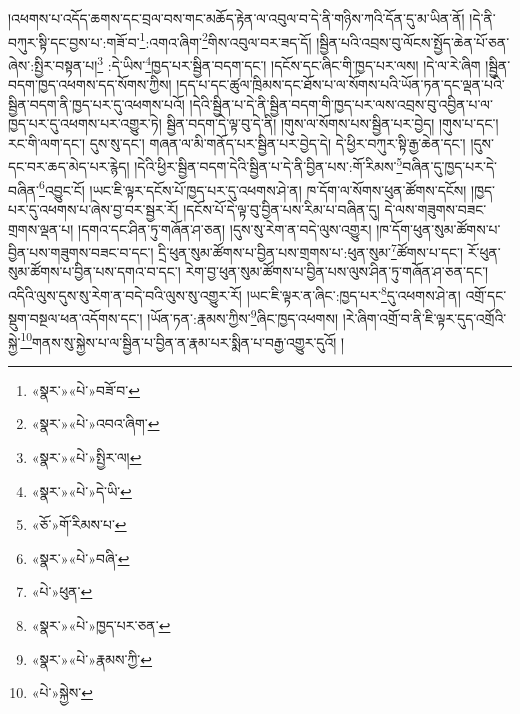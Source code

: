 །འཕགས་པ་འདོད་ཆགས་དང་བྲལ་བས་གང་མཆོད་རྟེན་ལ་འབུལ་བ་དེ་ནི་གཉིས་ཀའི་དོན་དུ་མ་ཡིན་ནོ། །དེ་ནི་བཀུར་སྟི་དང་བྱས་པ་:གཟོ་བ་\footnote{«སྣར་»«པེ་»བཟོ་བ་}:འགའ་ཞིག་\footnote{«སྣར་»«པེ་»འབའ་ཞིག་}གིས་འབུལ་བར་ཟད་དོ། །སྦྱིན་པའི་འབྲས་བུ་ལོངས་སྤྱོད་ཆེན་པོ་ཅན་ཞེས་:སྤྱིར་བསྟན་པ།\footnote{«སྣར་»«པེ་»སྤྱིར་ལ།} :དེ་ཡིས་\footnote{«སྣར་»«པེ་»དེ་ཡི་}ཁྱད་པར་སྦྱིན་བདག་དང་། །དངོས་དང་ཞིང་གི་ཁྱད་པར་ལས། །དེ་ལ་རེ་ཞིག །སྦྱིན་བདག་ཁྱད་འཕགས་དད་སོགས་ཀྱིས། །དད་པ་དང་ཚུལ་ཁྲིམས་དང་ཐོས་པ་ལ་སོགས་པའི་ཡོན་ཏན་དང་ལྡན་པའི་སྦྱིན་བདག་ནི་ཁྱད་པར་དུ་འཕགས་པའོ། །དེའི་སྦྱིན་པ་དེ་ནི་སྦྱིན་བདག་གི་ཁྱད་པར་ལས་འབྲས་བུ་འབྱིན་པ་ལ་ཁྱད་པར་དུ་འཕགས་པར་འགྱུར་ཏེ། སྦྱིན་བདག་དེ་ལྟ་བུ་དེ་ནི། །གུས་ལ་སོགས་པས་སྦྱིན་པར་བྱེད། །གུས་པ་དང་། རང་གི་ལག་དང་། དུས་སུ་དང་། གཞན་ལ་མི་གནོད་པར་སྦྱིན་པར་བྱེད་དེ། དེ་ཕྱིར་བཀུར་སྟི་རྒྱ་ཆེན་དང་། །དུས་དང་བར་ཆད་མེད་པར་རྙེད། །དེའི་ཕྱིར་སྦྱིན་བདག་དེའི་སྦྱིན་པ་དེ་ནི་བྱིན་པས་:གོ་རིམས་\footnote{«ཅོ་»གོ་རིམས་པ་}བཞིན་དུ་ཁྱད་པར་དེ་བཞིན་\footnote{«སྣར་»«པེ་»བཞི་}འབྱུང་ངོ། །ཡང་ཇི་ལྟར་དངོས་པོ་ཁྱད་པར་དུ་འཕགས་ཤེ་ན། ཁ་དོག་ལ་སོགས་ཕུན་ཚོགས་དངོས། །ཁྱད་པར་དུ་འཕགས་པ་ཞེས་བྱ་བར་སྦྱར་རོ། །དངོས་པོ་དེ་ལྟ་བུ་བྱིན་པས་རིམ་པ་བཞིན་དུ། དེ་ལས་གཟུགས་བཟང་གྲགས་ལྡན་པ། །དགའ་དང་ཤིན་ཏུ་གཞོན་ཤ་ཅན། །དུས་སུ་རེག་ན་བདེ་ལུས་འགྱུར། །ཁ་དོག་ཕུན་སུམ་ཚོགས་པ་བྱིན་པས་གཟུགས་བཟང་བ་དང་། དྲི་ཕུན་སུམ་ཚོགས་པ་བྱིན་པས་གྲགས་པ་:ཕུན་སུམ་\footnote{«པེ་»ཕུན་}ཚོགས་པ་དང་། རོ་ཕུན་སུམ་ཚོགས་པ་བྱིན་པས་དགའ་བ་དང་། རེག་བྱ་ཕུན་སུམ་ཚོགས་པ་བྱིན་པས་ལུས་ཤིན་ཏུ་གཞོན་ཤ་ཅན་དང་། འདིའི་ལུས་དུས་སུ་རེག་ན་བདེ་བའི་ལུས་སུ་འགྱུར་རོ། །ཡང་ཇི་ལྟར་ན་ཞིང་:ཁྱད་པར་\footnote{«སྣར་»«པེ་»ཁྱད་པར་ཅན་}དུ་འཕགས་ཤེ་ན། འགྲོ་དང་སྡུག་བསྔལ་ཕན་འདོགས་དང་། །ཡོན་ཏན་:རྣམས་ཀྱིས་\footnote{«སྣར་»«པེ་»རྣམས་ཀྱི་}ཞིང་ཁྱད་འཕགས། །རེ་ཞིག་འགྲོ་བ་ནི་ཇི་ལྟར་དུད་འགྲོའི་སྐྱེ་\footnote{«པེ་»སྐྱེས་}གནས་སུ་སྐྱེས་པ་ལ་སྦྱིན་པ་བྱིན་ན་རྣམ་པར་སྨིན་པ་བརྒྱ་འགྱུར་དུའོ། །
